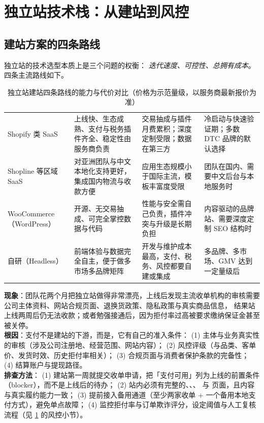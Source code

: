 \section{独立站技术栈：从建站到风控}
\label{sec:cbec-tech}

\subsection{建站方案的四条路线}

独立站的技术选型本质上是三个问题的权衡：
\emph{迭代速度、可控性、总拥有成本}。四条主流路线如下。

\begin{table}[htbp]
\centering
\caption{独立站建站四条路线的能力与代价对比（价格为示范量级，以服务商最新报价为准）}
\label{tab:cbec-stack}
\small
\begin{tabularx}{\textwidth}{L{2.3cm} L{2.6cm} L{2.6cm} Y}
\toprule
{} &  &  &  \\
\midrule
Shopify 类 SaaS & 上线快、生态成熟、支付与税务插件齐全、稳定性由服务商负责 & 交易抽成与插件月费累积；深度定制受限；数据在第三方 & 冷启动与快速验证期；多数 DTC 品牌的默认选择 \\
\addlinespace
Shopline 等区域 SaaS & 对亚洲团队与中文本地化支持更好，集成国内物流与收款方便 & 应用生态规模小于国际主流，模板丰富度受限 & 团队在国内、需要中文后台与本地服务时 \\
\addlinespace
WooCommerce（WordPress） & 开源、无交易抽成、可完全掌控数据与代码 & 性能与安全需自己负责，插件冲突与升级是长期负担 & 内容驱动的品牌站、需要深度定制 SEO 结构时 \\
\addlinespace
自研（Headless） & 前端体验与数据完全自主，便于做多市场多品牌矩阵 & 开发与维护成本最高，支付、税务、风控都要自建或集成 & 多品牌、多市场、GMV 达到一定量级后 \\
\bottomrule
\end{tabularx}
\end{table}

\begin{pitfall}
\textbf{现象}：团队花两个月把独立站做得非常漂亮，上线后发现主流收单机构的审核需要
公司主体资料、网站合规页面、退换货政策、隐私政策与真实商品信息，
结果站上线两周后仍无法收款；或者勉强接通后，因为拒付率过高被要求缴纳保证金甚至被关停。
\\
\textbf{根因}：支付不是建站的下游，而是，它有自己的准入条件：
(1) 主体与业务真实性的审核（涉及公司注册地、经营范围、网站内容）；
(2) 风控评级（与品类、客单价、发货时效、历史拒付率相关）；
(3) 合规页面与消费者保护条款的完备性；
(4) 结算账户与提现路径。
\\
\textbf{排查方法}：
(1) 建站第一周就提交收单申请，把「支付可用」列为上线的前置条件（blocker），而不是上线后的待办；
(2) 站内必须有完整的、、、
 与 页面，且内容与真实履约能力一致；
(3) 提前接入备用通道（至少两家收单 + 一个备用本地支付方式），避免单点故障；
(4) 监控拒付率与订单欺诈评分，设定阈值与人工复核流程（见 \cref{sec:cbec-tech} 的风控小节）。
\end{pitfall}

